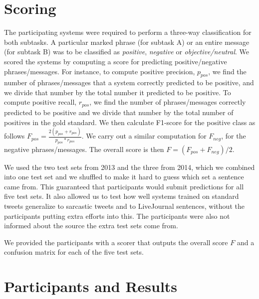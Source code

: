 \documentclass[11pt]{article}
\begin{document}
\section{Scoring}
\label{Section:scoring}


The participating systems were required to perform a three-way classification for both subtasks.
A particular marked phrase (for subtask A) or an entire message (for subtask B)
was to be classified as {\em positive}, {\em negative} or {\em objective/neutral}.
We scored the systems by computing a score for predicting positive/negative phrases/messages.
For instance, to compute positive precision, $p_{pos}$, we find the number of phrases/messages that a system correctly predicted to be positive,
and we divide that number by the total number it predicted to be positive.
To compute positive recall, $r_{pos}$, we find the number of phrases/messages correctly predicted to be positive and we divide that number by the total number of positives in the gold standard.
We then calculate F1-score for the positive class
as follows $F_{pos}=\frac{2(p_{pos}+r_{pos})}{p_{pos}*r_{pos}}$. We carry out a similar computation for $F_{neg}$,
for the negative phrases/messages.
The overall score
is then
$F=(F_{pos}+F_{neg})/2$.

We used the two test sets from 2013 and the three from 2014,
which we combined into one test set
and we shuffled to make it hard to guess which set a sentence came from.
This guaranteed that participants would submit predictions for all five test sets.
It also allowed us to test how well systems trained on standard tweets generalize to sarcastic tweets and to LiveJournal sentences, without the participants putting extra efforts into this.
The participants were also not informed about the source the extra test sets come from.

We provided the participants with a scorer that outputs the overall score $F$
and a confusion matrix for each of the five test sets.


\section{Participants and Results}
\end{document}
